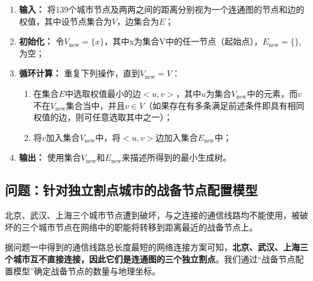 \documentclass{article}
\begin{document}
\begin{enumerate}
	\item \textbf{输入：} 将139个城市节点及两两之间的距离分别视为一个连通图的节点和边的权值，其中设节点集合为$V$，边集合为$E$；
	\item \textbf{初始化：} 令$V_{\mathrm{new}}=\{x\}$，其中x为集合V中的任一节点（起始点），$E_{\mathrm{new}}=\{ \}$,为空；
	\item \textbf{循环计算：} 重复下列操作，直到$V_{\mathrm{new}}=V$：

		\begin{enumerate}
			\item 在集合$E$中选取权值最小的边$<u, v>$，其中$u$为集合$V_{\mathrm{new}}$中的元素，而$v$不在$V_{\mathrm{new}}$集合当中，并且$v \in V$（如果存在有多条满足前述条件即具有相同权值的边，则可任意选取其中之一）；
			\item 将$v$加入集合$V_{\mathrm{new}}$中，将$<u, v>$边加入集合$E_{\mathrm{new}}$中；
		\end{enumerate}

	\item \textbf{输出：} 使用集合$V_{\mathrm{new}}$和$E_{\mathrm{new}}$来描述所得到的最小生成树。
\end{enumerate}

\subsection{问题：针对独立割点城市的战备节点配置模型}
\label{ssub:问题\chinese{subsection}：针对独立割点城市的战备节点配置模型}

北京、武汉、上海三个城市节点遭到破坏，与之连接的通信线路均不能使用，被破坏的三个城市节点在网络中的职能将转移到距离最近的战备节点上。

据问题一中得到的通信线路总长度最短的网络连接方案可知，\textbf{北京、武汉、上海三个城市互不直接连接，因此它们是连通图的三个独立割点}。我们通过“战备节点配置模型”确定战备节点的数量与地理坐标。
\end{document}
